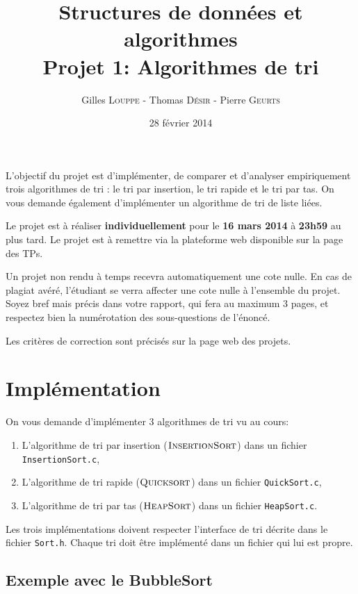 \documentclass[a4paper,10pt]{article}
\title{
    \textbf{Structures de données et algorithmes}\\
    Projet 1: Algorithmes de tri
}
\author{Gilles \textsc{Louppe} - Thomas \textsc{Désir} - Pierre \textsc{Geurts}}
\date{28 février 2014}
\begin{document}
\maketitle


L'objectif du projet est d'implémenter, de comparer et d'analyser
empiriquement trois algorithmes de tri : le tri par insertion, le tri rapide et
le tri par tas. On vous demande également d'implémenter un
algorithme de tri de liste liées.

Le projet est à réaliser {\bf individuellement} pour le {\bf 16 mars
  2014} à {\bf 23h59} au plus tard. Le projet est à remettre via la
plateforme web disponible sur la page des TPs.

Un projet non rendu à temps recevra automatiquement une cote nulle. En
cas de plagiat avéré, l'étudiant se verra affecter une cote nulle à
l'ensemble du projet. Soyez bref mais précis dans votre rapport, qui
fera au maximum 3 pages, et respectez bien la numérotation des
sous-questions de l'énoncé.

Les critères de correction sont précisés sur la page web des projets.

\section{Implémentation}

On vous demande d'implémenter 3 algorithmes de tri vu au cours:
\begin{enumerate}
\item L'algorithme de tri par insertion ($\textnormal{\scshape InsertionSort}$) dans un fichier \texttt{InsertionSort.c},
\item L'algorithme de tri rapide ($\textnormal{\scshape Quicksort}$) dans un fichier \texttt{QuickSort.c},
\item L'algorithme de tri par tas ($\textnormal{\scshape HeapSort}$) dans un fichier \texttt{HeapSort.c}.
\end{enumerate}
Les trois implémentations doivent respecter l'interface de tri décrite
dans le fichier \texttt{Sort.h}. Chaque tri doit être implémenté dans
un fichier qui lui est propre.

\subsection*{Exemple avec le BubbleSort}
\end{document}
